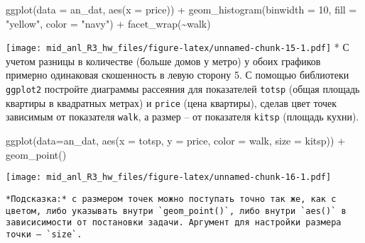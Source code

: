 \documentclass[
]{article}
\newenvironment{Shaded}{\begin{snugshade}}{\end{snugshade}}
\newcommand{\AttributeTok}[1]{\textcolor[rgb]{0.77,0.63,0.00}{#1}}
\newcommand{\DecValTok}[1]{\textcolor[rgb]{0.00,0.00,0.81}{#1}}
\newcommand{\FunctionTok}[1]{\textcolor[rgb]{0.00,0.00,0.00}{#1}}
\newcommand{\NormalTok}[1]{#1}
\newcommand{\SpecialCharTok}[1]{\textcolor[rgb]{0.00,0.00,0.00}{#1}}
\newcommand{\StringTok}[1]{\textcolor[rgb]{0.31,0.60,0.02}{#1}}
\begin{document}
\begin{Shaded}
\begin{Highlighting}[]
\FunctionTok{ggplot}\NormalTok{(}\AttributeTok{data =}\NormalTok{ an\_dat, }\FunctionTok{aes}\NormalTok{(}\AttributeTok{x =}\NormalTok{ price)) }\SpecialCharTok{+}
\FunctionTok{geom\_histogram}\NormalTok{(}\AttributeTok{binwidth =} \DecValTok{10}\NormalTok{, }\AttributeTok{fill =} \StringTok{"yellow"}\NormalTok{, }\AttributeTok{color =} \StringTok{"navy"}\NormalTok{) }\SpecialCharTok{+}
\FunctionTok{facet\_wrap}\NormalTok{(}\SpecialCharTok{\textasciitilde{}}\NormalTok{walk)}
\end{Highlighting}
\end{Shaded}

\texttt{[image: mid\_anl\_R3\_hw\_files/figure-latex/unnamed-chunk-15-1.pdf]}
* С учетом разницы в количестве (больше домов у метро) у обоих графиков
примерно одинаковая скошенность в левую сторону 5. С помощью библиотеки
\texttt{ggplot2} постройте диаграммы рассеяния для показателей
\texttt{totsp} (общая площадь квартиры в квадратных метрах) и
\texttt{price} (цена квартиры), сделав цвет точек зависимым от
показателя \texttt{walk}, а размер -- от показателя \texttt{kitsp}
(площадь кухни).

\begin{Shaded}
\begin{Highlighting}[]
\FunctionTok{ggplot}\NormalTok{(}\AttributeTok{data=}\NormalTok{an\_dat, }\FunctionTok{aes}\NormalTok{(}\AttributeTok{x =}\NormalTok{ totsp, }\AttributeTok{y =}\NormalTok{ price, }\AttributeTok{color =}\NormalTok{ walk, }\AttributeTok{size =}\NormalTok{ kitsp)) }\SpecialCharTok{+} \FunctionTok{geom\_point}\NormalTok{()}
\end{Highlighting}
\end{Shaded}

\texttt{[image: mid\_anl\_R3\_hw\_files/figure-latex/unnamed-chunk-16-1.pdf]}

\begin{verbatim}
*Подсказка:* с размером точек можно поступать точно так же, как с цветом, либо указывать внутри `geom_point()`, либо внутри `aes()` в зависисимости от постановки задачи. Аргумент для настройки размера точки – `size`.
\end{verbatim}
\end{document}
